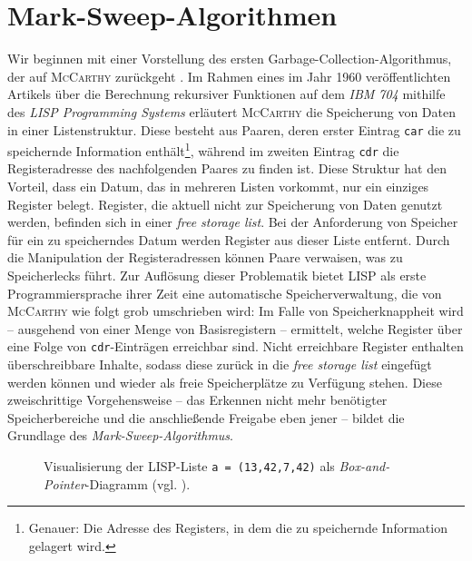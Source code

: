 \chapter{Mark-Sweep-Algorithmen}
\label{cha:mark-sweep}
Wir beginnen mit einer Vorstellung des ersten Garbage-Collection-Algorithmus, der auf \textsc{McCarthy} zurückgeht \cite[191--193]{mccarthy1960}.
Im Rahmen eines im Jahr 1960 veröffentlichten Artikels über die Berechnung rekursiver Funktionen auf dem \textit{IBM 704} mithilfe des \textit{LISP Programming Systems} erläutert \textsc{McCarthy} die Speicherung von Daten in einer Listenstruktur.
Diese besteht aus Paaren, deren erster Eintrag \texttt{car} die zu speichernde Information enthält\footnote{Genauer: Die Adresse des Registers, in dem die zu speichernde Information gelagert wird.}, während im zweiten Eintrag \texttt{cdr} die Registeradresse des nachfolgenden Paares zu finden ist.
Diese Struktur hat den Vorteil, dass ein Datum, das in mehreren Listen vorkommt, nur ein einziges Register belegt.
Register, die aktuell nicht zur Speicherung von Daten genutzt werden, befinden sich in einer \textit{free storage list}.
Bei der Anforderung von Speicher für ein zu speicherndes Datum werden Register aus dieser Liste entfernt.
Durch die Manipulation der Registeradressen können Paare verwaisen, was zu Speicherlecks führt.
Zur Auflösung dieser Problematik bietet LISP als erste Programmiersprache ihrer Zeit eine automatische Speicherverwaltung, die von \textsc{McCarthy} wie folgt grob umschrieben wird:
Im Falle von Speicherknappheit wird -- ausgehend von einer Menge von Basisregistern -- ermittelt, welche Register über eine Folge von \texttt{cdr}-Einträgen erreichbar sind.
Nicht erreichbare Register enthalten überschreibbare Inhalte, sodass diese zurück in die \textit{free storage list} eingefügt werden können und wieder als freie Speicherplätze zu Verfügung stehen.
Diese zweischrittige Vorgehensweise -- das Erkennen nicht mehr benötigter Speicherbereiche und die anschließende Freigabe eben jener -- bildet die Grundlage des \textit{Mark-Sweep-Algorithmus}.

\begin{figure}[h]
	\centering
	
	\caption[Visualisierung einer LISP-Liste]{Visualisierung der LISP-Liste \texttt{a = (13,42,7,42)} als \textit{Box-and-Pointer}-Diagramm (vgl. \cite[Kapitel 3.3]{sicp}).}
	\label{fig:lisp-list}
\end{figure}




